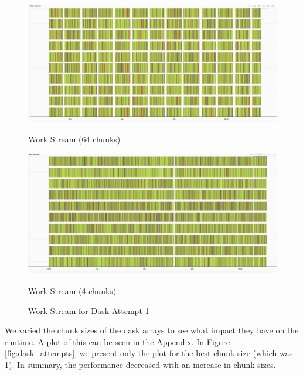 \documentclass[a4paper,10pt]{article}
\begin{document}
 \begin{figure}[h!]
    \begin{minipage}{0.5\textwidth}
        \centering
        \includegraphics[width=\linewidth]{images/dask/dask_opt1_n_by_8.png}
       \caption{Work Stream (64 chunks)}
        \label{fig:dask_opt1_stream_64}
    \end{minipage}
    \hspace{0.1cm}
    \begin{minipage}{0.5\textwidth}
        \centering
        \includegraphics[width=\linewidth]{images/dask/dask_opt1_n_by_2.png}
       \caption{Work Stream (4 chunks)}
       \label{fig:dask_opt1_stream_4}
   \end{minipage}
   \caption{Work Stream for Dask Attempt 1}
   \label{fig:dask_opt1_stream}
 \end{figure}
We varied the chunk sizes of the dask arrays to see what impact they have on the runtime. A plot of this can be seen in the \hyperref[fig:dask_opt1_chunk_size]{Appendix}. In Figure \ref{fig:dask_attempts}, we present only the plot for the best chunk-size (which was 1). In summary, the performance decreased with an increase in chunk-sizes. 
\end{document}

